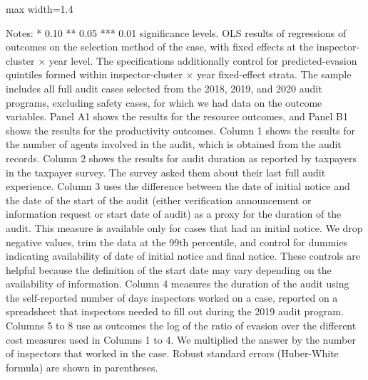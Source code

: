 \documentclass{article}
\newcommand{\OutPath}{Output/}%
\newcommand{\OutPath}{../Output/}%
\begin{document}
\begin{landscape}
\begin{table}[H]\centering
\begin{adjustbox}{max width=1.4\textwidth}
\begin{threeparttable}
\caption{Resources Allocated to Audits and Audit Productivity, Full Audits, with Predicted Evasion Quintile Controls (Panels A1 and B1 only)}
\label{tab:table5_fullaudits_yhatrf_quintiles_control}

\footnotesize


\begin{tablenotes}[flushleft]
\footnotesize
\item Notes: * 0.10 ** 0.05 *** 0.01 significance levels. OLS results of regressions of outcomes on the selection method of the case, with fixed effects at the inspector-cluster $\times$ year level. The specifications additionally control for predicted-evasion quintiles formed within inspector-cluster $\times$ year fixed-effect strata. The sample includes all full audit cases selected from the 2018, 2019, and 2020 audit programs, excluding safety cases, for which we had data on the outcome variables. Panel A1 shows the results for the resource outcomes, and Panel B1 shows the results for the productivity outcomes. Column 1 shows the results for the number of agents involved in the audit, which is obtained from the audit records. Column 2 shows the results for audit duration as reported by taxpayers in the taxpayer survey. The survey asked them about their last full audit experience. Column 3 uses the difference between the date of initial notice and the date of the start of the audit (either verification announcement or information request or start date of audit) as a proxy for the duration of the audit. This measure is available only for cases that had an initial notice. We drop negative values, trim the data at the 99th percentile, and control for dummies indicating availability of date of initial notice and final notice. These controls are helpful because the definition of the start date may vary depending on the availability of information. Column 4 measures the duration of the audit using the self-reported number of days inspectors worked on a case, reported on a spreadsheet that inspectors needed to fill out during the 2019 audit program. Columns 5 to 8 use as outcomes the log of the ratio of evasion over the different cost measures used in Columns 1 to 4. We multiplied the answer by the number of inspectors that worked in the case. Robust standard errors (Huber-White formula) are shown in parentheses.
\end{tablenotes}
\end{threeparttable}
\end{adjustbox}
\end{table}


\end{landscape}
\end{document}

